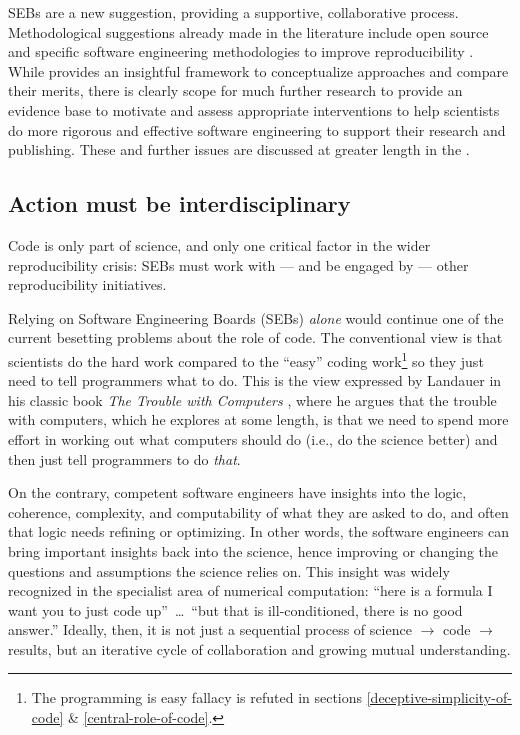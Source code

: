 SEBs are a new suggestion, providing a supportive, collaborative process. Methodological suggestions already made in the literature include open source and specific software engineering methodologies to improve reproducibility \cite{basic-reproducibilty,open-source}. While \cite{ABCs-SE} provides an insightful framework to conceptualize approaches and compare their merits, there is clearly scope for much further research to provide an evidence base to motivate and assess appropriate interventions to help scientists do more rigorous and effective software engineering to support their research and publishing. These and further issues are discussed at greater length in the \supplement. 

\begin{change}
\subsection{Action must be interdisciplinary}
\setcounter{footnote}{1}
Code is only part of science, and only one critical factor in the wider reproducibility crisis: SEBs must work with --- and be engaged by --- other reproducibility initiatives.
 
Relying on Software Engineering Boards (SEBs) \emph{alone\/} would continue one of the current besetting problems about the role of code. The conventional view is that scientists do the hard work compared to the ``easy'' coding work\footnote{The programming is easy fallacy is refuted in sections \ref{deceptive-simplicity-of-code} \& \ref{central-role-of-code}.} so they just need to tell programmers what to do. This is the view expressed by Landauer in his classic book \emph{The Trouble with Computers\/} \cite{landauer,thimbleby-landauer}, where he argues that the trouble with computers, which he explores at some length, is that we need to spend more effort in working out what computers should do (i.e., do the science better) and then just tell programmers to do \emph{that}.  

On the contrary, competent software engineers have insights into the logic, coherence, complexity, and computability of what they are asked to do, and often that logic needs refining or optimizing. In other words, the software engineers can bring important insights back into the science, hence improving or changing the questions and assumptions the science relies on. This insight was widely recognized in the specialist area of numerical computation: ``here is a formula I want you to just code up''~\ldots\ ``but that is ill-conditioned, there is no good answer.'' Ideally, then, it is not just a sequential process of science $\rightarrow$ code $\rightarrow$ results, but an iterative cycle of collaboration and growing mutual understanding.


\end{change}
